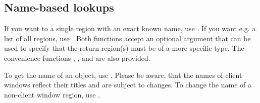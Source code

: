 \subsection{Name-based lookups}

If you want to a single region with an exact known name, use
. If you want e.g. a list of all regions,
use . Both functions accept an
optional argument that can be used to specify that the return region(s)
must be of a more specific type. The convenience functions
, ,
 and  are also
provided.

To get the name of an object, use . Please be
aware, that the names of client windows reflect their titles and
are subject to changes. To change the name of a non-client window
region, use .







